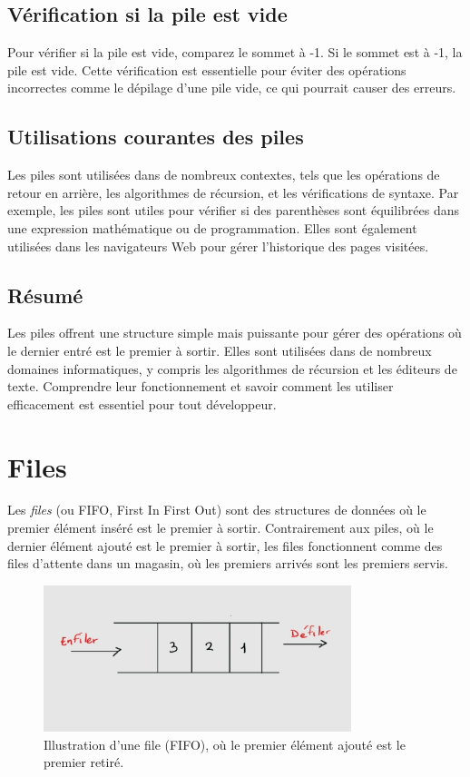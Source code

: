 \subsection{Vérification si la pile est vide}
Pour vérifier si la pile est vide, comparez le sommet à -1. Si le sommet est à -1, la pile est vide. Cette vérification est essentielle pour éviter des opérations incorrectes comme le dépilage d'une pile vide, ce qui pourrait causer des erreurs.

\subsection{Utilisations courantes des piles}
Les piles sont utilisées dans de nombreux contextes, tels que les opérations de retour en arrière, les algorithmes de récursion, et les vérifications de syntaxe. Par exemple, les piles sont utiles pour vérifier si des parenthèses sont équilibrées dans une expression mathématique ou de programmation. Elles sont également utilisées dans les navigateurs Web pour gérer l'historique des pages visitées.

\subsection{Résumé}
Les piles offrent une structure simple mais puissante pour gérer des opérations où le dernier entré est le premier à sortir. Elles sont utilisées dans de nombreux domaines informatiques, y compris les algorithmes de récursion et les éditeurs de texte. Comprendre leur fonctionnement et savoir comment les utiliser efficacement est essentiel pour tout développeur.


\section{Files}

Les \emph{files} (ou FIFO, First In First Out) sont des structures de données où le premier élément inséré est le premier à sortir. Contrairement aux piles, où le dernier élément ajouté est le premier à sortir, les files fonctionnent comme des files d'attente dans un magasin, où les premiers arrivés sont les premiers servis.

\begin{figure}[H]
	\centering
	 \includegraphics[width=0.8\textwidth]{image/q}  %
	\caption{Illustration d'une file (FIFO), où le premier élément ajouté est le premier retiré.}
\end{figure}

